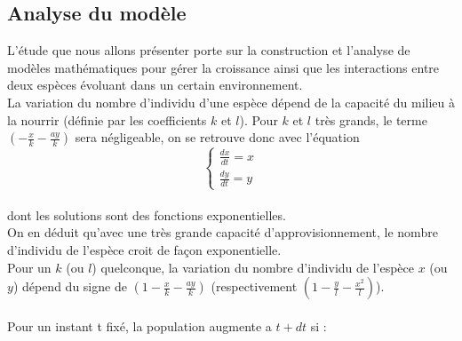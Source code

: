 \documentclass{article}
\begin{document}
\subsection{Analyse du modèle}
L’étude que nous allons présenter porte sur la construction et l’analyse de modèles mathématiques pour gérer la croissance ainsi que les interactions entre deux espèces évoluant dans un certain environnement.\\
La variation du nombre d'individu d'une espèce dépend de la capacité du milieu à la nourrir (définie par les coefficients $k$ et $l$). Pour $k$ et $l$ très grands, le terme $(- \frac{x}{k} - \frac{a y}{k})$ sera négligeable, on se retrouve donc avec l'équation
\begin{equation*}
\left\{
\begin{array}{ll}
    \frac{dx}{dt} = x \\
    \frac{dy}{dt} = y
\end{array}
\right.
\end{equation*}
\\dont les solutions sont des fonctions exponentielles. \\ On en déduit qu'avec une très grande capacité d'approvisionnement, le nombre d'individu de l'espèce croit de façon exponentielle. \\ Pour un $k$ (ou $l$) quelconque, la variation du nombre d'individu de l'espèce $x$ (ou $y$) dépend du signe de \hspace{0.1cm} $(1 - \frac{x}{k} - \frac{a y}{k})$ \hspace{0.1cm} (respectivement $ (1 -\frac{y}{l} - \frac{x^{2}}{l})$).
\\\\Pour un instant t fixé, la population augmente a $t + dt$ si :
\end{document}
